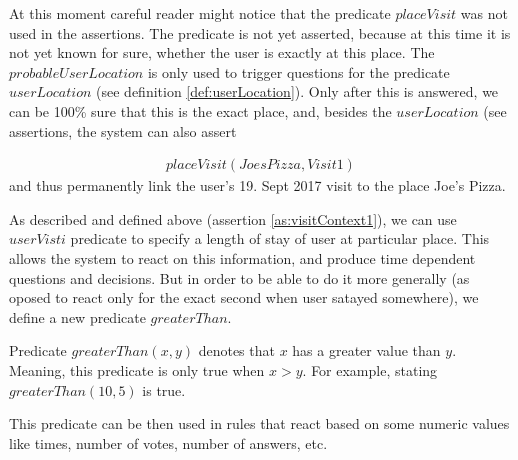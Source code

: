At this moment careful reader might notice that the predicate $placeVisit$ was
not used in the assertions. The predicate is not yet asserted, because at 
this time it is not yet known for sure, whether the user is exactly at this 
place. The $probableUserLocation$ is only used to trigger questions for the
predicate $userLocation$ (see definition \ref{def:userLocation}). Only after 
this is answered, we can be
100\% sure that this is the exact place, and, besides the $userLocation$ (see
assertions, the system can also assert

\begin{equation}\label{as:placeVisit}
\begin{gathered}
	placeVisit(JoesPizza,Visit1)
\end{gathered}
\end{equation}
and thus permanently link the user's 19. Sept 2017 visit to the place 
Joe's Pizza.

As described and defined above (assertion \ref{as:visitContext1}), we can use
$userVisti$ predicate to specify a length of stay of user at particular place.
This allows the system to react on this information, and produce time dependent
questions and decisions. But in order to be able to do it more generally
(as oposed to react only for the exact second when user satayed somewhere), we
define a new predicate $greaterThan$.

\begin{definition}\label{def:greaterThan}
Predicate $greaterThan(x,y)$ denotes that $x$ has a greater value than $y$. 
Meaning, this predicate is only true when $x > y$. For example, 
stating $greaterThan(10, 5)$ is true.
\end{definition}
This predicate can be then used in rules that react based on some numeric 
values like times, number of votes, number of answers, etc.

